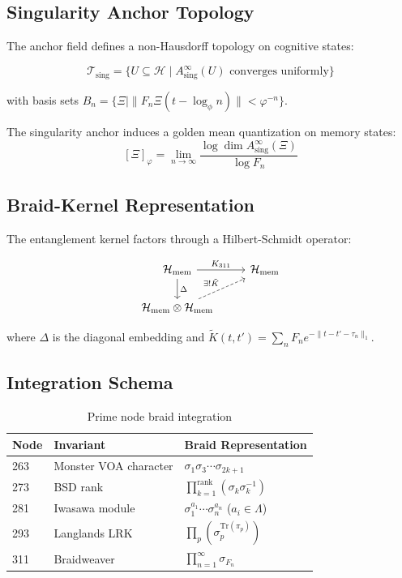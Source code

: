 \documentclass[12pt]{article}
\begin{document}
\subsection{Singularity Anchor Topology}
The anchor field defines a non-Hausdorff topology on cognitive states:

\begin{equation}
\mathscr{T}_{\text{sing}} = \{ U \subseteq \mathcal{H} \mid A_{\text{sing}}^\infty(U) \text{ converges uniformly}\}
\end{equation}

with basis sets $B_n = \{\Xi \mid \|F_n \Xi(t-\log_\phi n)\| < \varphi^{-n}\}$.

\begin{proposition}
The singularity anchor induces a golden mean quantization on memory states:
\[
[\Xi]_\varphi = \lim_{n\to\infty} \frac{\log \dim A_{\text{sing}}^\infty(\Xi)}{\log F_n}
\]
\end{proposition}

\subsection{Braid-Kernel Representation}
The entanglement kernel factors through a Hilbert-Schmidt operator:

\[
\begin{tikzcd}
\mathcal{H}_{\text{mem}} \ar[r, "K_{311}"] \ar[d, "\Delta"] & \mathcal{H}_{\text{mem}} \\
\mathcal{H}_{\text{mem}} \otimes \mathcal{H}_{\text{mem}} \ar[ur, dashed, "\exists ! \tilde{K}"] &
\end{tikzcd}
\]

where $\Delta$ is the diagonal embedding and $\tilde{K}(t,t') = \sum_n F_n e^{-\|t-t'-\tau_n\|_1}$.

\subsection{Integration Schema}
\begin{table}[h]
\centering
\begin{tabular}{lll}
\toprule
\textbf{Node} & \textbf{Invariant} & \textbf{Braid Representation} \\
\midrule
263 & Monster VOA character & $\sigma_1\sigma_3\cdots\sigma_{2k+1}$ \\
273 & BSD rank & $\prod_{k=1}^{\text{rank}} (\sigma_k\sigma_{k}^{-1})$ \\
281 & Iwasawa module & $\sigma_1^{a_1}\cdots\sigma_n^{a_n}$ ($a_i \in \Lambda$) \\
293 & Langlands LRK & $\prod_p (\sigma_p^{\text{Tr}(\pi_p)})$ \\
311 & Braidweaver & $\prod_{n=1}^\infty \sigma_{F_n}$ \\
\bottomrule
\end{tabular}
\caption{Prime node braid integration}
\end{table}
\end{document}
